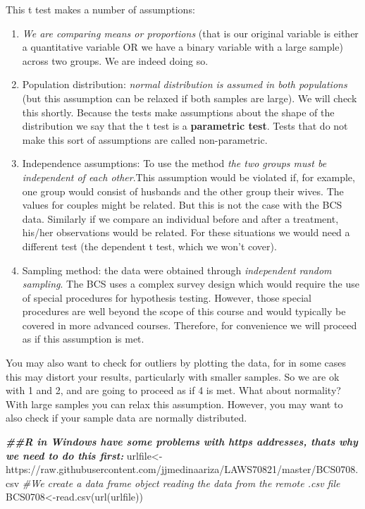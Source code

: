 \documentclass[
]{book}
\newenvironment{Shaded}{\begin{snugshade}}{\end{snugshade}}
\newcommand{\CommentTok}[1]{\textcolor[rgb]{0.56,0.35,0.01}{\textit{#1}}}
\newcommand{\DocumentationTok}[1]{\textcolor[rgb]{0.56,0.35,0.01}{\textbf{\textit{#1}}}}
\newcommand{\FunctionTok}[1]{\textcolor[rgb]{0.00,0.00,0.00}{#1}}
\newcommand{\NormalTok}[1]{#1}
\newcommand{\OtherTok}[1]{\textcolor[rgb]{0.56,0.35,0.01}{#1}}
\newcommand{\StringTok}[1]{\textcolor[rgb]{0.31,0.60,0.02}{#1}}
\begin{document}
This t test makes a number of assumptions:

\begin{enumerate}
\def\labelenumi{\arabic{enumi}.}
\item
  \emph{We are comparing means or proportions} (that is our original variable is either a quantitative variable OR we have a binary variable with a large sample) across two groups. We are indeed doing so.
\item
  Population distribution: \emph{normal distribution is assumed in both populations} (but this assumption can be relaxed if both samples are large). We will check this shortly. Because the tests make assumptions about the shape of the distribution we say that the t test is a \textbf{parametric test}. Tests that do not make this sort of assumptions are called non-parametric.
\item
  Independence assumptions: To use the method \emph{the two groups must be independent of each other}.This assumption would be violated if, for example, one group would consist of husbands and the other group their wives. The values for couples might be related. But this is not the case with the BCS data. Similarly if we compare an individual before and after a treatment, his/her observations would be related. For these situations we would need a different test (the dependent t test, which we won't cover).
\item
  Sampling method: the data were obtained through \emph{independent random sampling}. The BCS uses a complex survey design which would require the use of special procedures for hypothesis testing. However, those special procedures are well beyond the scope of this course and would typically be covered in more advanced courses. Therefore, for convenience we will proceed as if this assumption is met.
\end{enumerate}

You may also want to check for outliers by plotting the data, for in some cases this may distort your results, particularly with smaller samples. So we are ok with 1 and 2, and are going to proceed as if 4 is met. What about normality? With large samples you can relax this assumption. However, you may want to also check if your sample data are normally distributed.

\begin{Shaded}
\begin{Highlighting}[]
\DocumentationTok{\#\#R in Windows have some problems with https addresses, that\textquotesingle{}s why we need to do this first:}
\NormalTok{urlfile}\OtherTok{\textless{}{-}}\StringTok{\textquotesingle{}https://raw.githubusercontent.com/jjmedinaariza/LAWS70821/master/BCS0708.csv\textquotesingle{}}
\CommentTok{\#We create a data frame object reading the data from the remote .csv file}
\NormalTok{BCS0708}\OtherTok{\textless{}{-}}\FunctionTok{read.csv}\NormalTok{(}\FunctionTok{url}\NormalTok{(urlfile))}
\end{Highlighting}
\end{Shaded}
\end{document}
